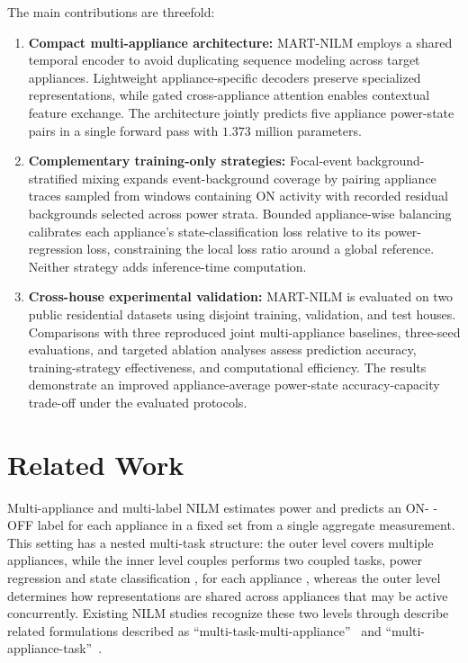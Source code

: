 \documentclass[journal]{IEEEtran}
\providecommand{\DIFadd}[1]{{\protect\color{blue} \sf #1}} %
\providecommand{\DIFdel}[1]{{\protect\color{red} \scriptsize #1}} %
\providecommand{\DIFaddbegin}{} %
\providecommand{\DIFaddend}{} %
\providecommand{\DIFdelbegin}{} %
\providecommand{\DIFdelend}{} %
\providecommand{\DIFscaledelfig}{0.5}
\newlength{\DIFdelgraphicswidth} %
\newlength{\DIFdelgraphicsheight} %
\providecommand{\DIFaddincludegraphics}[2][]{{\color{blue}\fbox{\DIFOincludegraphics[#1]{#2}}}} %
\providecommand{\DIFdelincludegraphics}[2][]{%
\sbox{\DIFdelgraphicsbox}{\DIFOincludegraphics[#1]{#2}}%
\settoboxwidth{\DIFdelgraphicswidth}{\DIFdelgraphicsbox} %
\settoboxtotalheight{\DIFdelgraphicsheight}{\DIFdelgraphicsbox} %
\scalebox{\DIFscaledelfig}{%
\parbox[b]{\DIFdelgraphicswidth}{\usebox{\DIFdelgraphicsbox}\\[-\baselineskip] \rule{\DIFdelgraphicswidth}{0em}}\llap{\resizebox{\DIFdelgraphicswidth}{\DIFdelgraphicsheight}{%
\setlength{\unitlength}{\DIFdelgraphicswidth}%
\begin{picture}(1,1)%
\thicklines\linethickness{2pt} %
{\color[rgb]{1,0,0}\put(0,0){\framebox(1,1){}}}%
{\color[rgb]{1,0,0}\put(0,0){\line( 1,1){1}}}%
{\color[rgb]{1,0,0}\put(0,1){\line(1,-1){1}}}%
\end{picture}%
}\hspace*{3pt}}} %
} %
\DeclareRobustCommand{\DIFaddbegin}{\DIFOaddbegin \let\includegraphics\DIFaddincludegraphics} %
\DeclareRobustCommand{\DIFaddend}{\DIFOaddend \let\includegraphics\DIFOincludegraphics} %
\DeclareRobustCommand{\DIFdelbegin}{\DIFOdelbegin \let\includegraphics\DIFdelincludegraphics} %
\DeclareRobustCommand{\DIFdelend}{\DIFOaddend \let\includegraphics\DIFOincludegraphics} %
\begin{document}
The main contributions are threefold:
\begin{enumerate}
    \item \textbf{Compact multi-appliance architecture:} MART-NILM employs a shared temporal encoder to avoid duplicating sequence modeling across target appliances. Lightweight appliance-specific decoders preserve specialized representations, while gated cross-appliance attention enables contextual feature exchange. The architecture jointly predicts five appliance power-state pairs in a single forward pass with $1.373$ million parameters.

    \item \textbf{Complementary training-only strategies:} Focal-event background-stratified mixing expands event-background coverage by pairing appliance traces sampled from windows containing ON activity with recorded residual backgrounds selected across power strata. Bounded appliance-wise balancing calibrates each appliance's state-classification loss relative to its power-regression loss, constraining the local loss ratio around a global reference. Neither strategy adds inference-time computation.

    \item \textbf{Cross-house experimental validation:} MART-NILM is evaluated on two public residential datasets using disjoint training, validation, and test houses. Comparisons with three reproduced joint multi-appliance baselines, three-seed evaluations, and targeted ablation analyses assess prediction accuracy, training-strategy effectiveness, and computational efficiency. The results demonstrate an improved appliance-average power-state accuracy-capacity trade-off under the evaluated protocols.
\end{enumerate}

\section{Related Work}
\label{sec:background-related-work}

Multi-appliance and multi-label NILM estimates power and predicts an ON-\DIFdelbegin \DIFdel{-}\DIFdelend OFF label for each appliance in a fixed set from a single aggregate measurement. This setting has a nested multi-task structure: the \DIFaddbegin \DIFadd{outer level covers multiple appliances, while the }\DIFaddend inner level \DIFdelbegin \DIFdel{couples }\DIFdelend \DIFaddbegin \DIFadd{performs two coupled tasks, }\DIFaddend power regression and state classification\DIFaddbegin \DIFadd{, }\DIFaddend for each appliance\DIFdelbegin \DIFdel{, whereas the outer level determines how representations are shared across appliances that may be active concurrently}\DIFdelend . Existing \DIFdelbegin \DIFdel{NILM }\DIFdelend studies \DIFdelbegin \DIFdel{recognize these two levels through }\DIFdelend \DIFaddbegin \DIFadd{describe related }\DIFaddend formulations \DIFdelbegin \DIFdel{described }\DIFdelend as ``multi-task-multi-appliance''~\cite{faustine2020unet} and ``multi-appliance-task''~\cite{xiong2024matnilm,sun2025transfer}. \DIFdelbegin %
\end{document}

